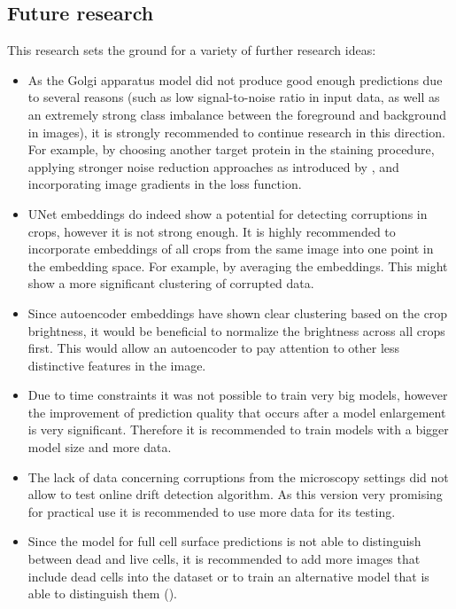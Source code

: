 \subsection{Future research}
This research sets the ground for a variety of further research ideas:
\begin{itemize}
    \item As the Golgi apparatus model did not produce good enough predictions due to several reasons (such as low signal-to-noise ratio in input data, as well as an extremely strong class imbalance between the foreground and background in images), it is strongly recommended to continue research in this direction. For example, by choosing another target protein in the staining procedure, applying stronger noise reduction approaches as introduced by \cite{noise2void}, and incorporating image gradients in the loss function.
    \item UNet embeddings do indeed show a potential for detecting corruptions in crops, however it is not strong enough. It is highly recommended to incorporate embeddings of all crops from the same image into one point in the embedding space. For example, by averaging the embeddings. This might show a more significant clustering of corrupted data.
    \item Since autoencoder embeddings have shown clear clustering based on the crop brightness, it would be beneficial to normalize the brightness across all crops first. This would allow an autoencoder to pay attention to other less distinctive features in the image.
    \item Due to time constraints it was not possible to train very big models, however the improvement of prediction quality that occurs after a model enlargement is very significant. Therefore it is recommended to train models with a bigger model size and more data.
    \item The lack of data concerning corruptions from the microscopy settings did not allow to test online drift detection algorithm. As this version very promising for practical use it is recommended to use more data for its testing.
    \item Since the model for full cell surface predictions is not able to distinguish between dead and live cells, it is recommended to add more images that include dead cells into the dataset or to train an alternative model that is able to distinguish them (\cite{Ounkomol_2018}).
\end{itemize}
 